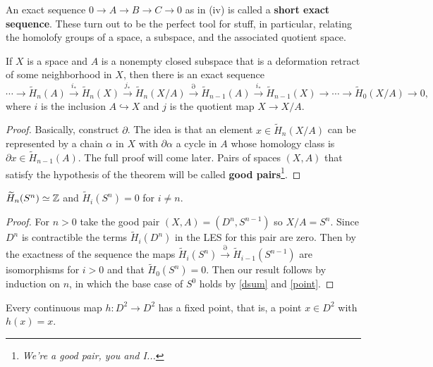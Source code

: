 An exact sequence $0 \to A\to B\to C\to 0$ as in (iv) is called a \textbf{short exact sequence}. These turn out to be the perfect tool for stuff, in particular, relating the homolofy groups of a space, a subspace, and the associated quotient space.
\begin{theorem}
    If $X$ is a space and $A$ is a nonempty closed subspace that is a deformation retract of some neighborhood in $X$, then there is an exact sequence \[
        \cdots \to \widetilde H_n (A) \overset{i_*}{\longrightarrow} \widetilde H_n (X) \overset{j_*}{\longrightarrow} \widetilde H_n (X/A) \overset{\partial }{\longrightarrow} \widetilde H_{n-1}(A) \overset{i_*}{\longrightarrow} \widetilde H_{n-1}(X) \to \cdots \to \widetilde H_0(X /A)\to 0,
    \] where $i$ is the inclusion $A\hookrightarrow X$ and $j$ is the quotient map $X\to X /A$.
\end{theorem}
\begin{proof}
    Basically, construct $\partial $. The idea is that an element $x\in \widetilde H_n (X /A)$ can be represented by a chain $\alpha $ in $X$ with $\partial \alpha $ a cycle in $A$ whose homology class is $\partial x\in \widetilde H_{n-1}(A)$. The full proof will come later.
    Pairs of spaces $(X, A)$ that satisfy the hypothesis of the theorem will be called \textbf{good pairs}\footnote{\textit{We're a good pair, you and I...}}.
\end{proof}
\begin{cor}
    $\widetilde H_n (S^n )\simeq\mathbb{Z}$ and $\widetilde H_i (S^n )=0$ for $i\neq n$. 
\end{cor}
\begin{proof}
    For $n>0$ take the good pair $(X,A)=(D^n ,S^{n-1})$ so $X/A=S^n $. Since $D^n $ is contractible the terms $\widetilde H_i (D^n )$ in the LES for this pair are zero. Then by the exactness of the sequence the maps $\widetilde H_i (S^n )\overset{\partial }{\longrightarrow}\widetilde H_{i-1}(S^{n-1}) $ are isomorphisms for $i>0$ and that $\widetilde H_0(S^n )=0$. Then our result follows by induction on $n$, in which the base case of $S^0$ holds by \cref{dsum} and \cref{point}.
\end{proof}
\begin{lemma}\label{fixed}
    Every continuous map $h \colon D^2 \to D^2$ has a fixed point, that is, a point $x\in D^2$ with $h(x)=x$.
\end{lemma}
